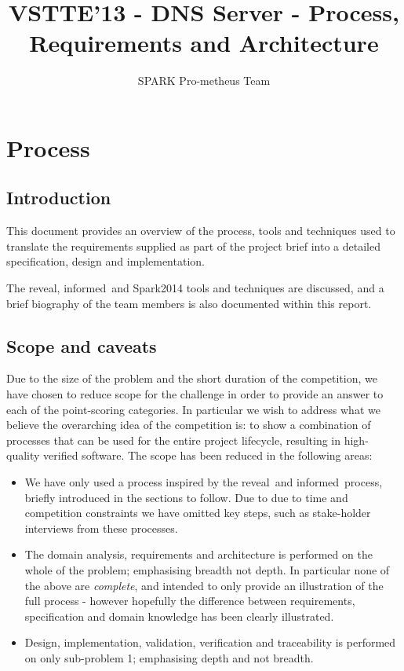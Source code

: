 \documentclass{report}
\title{VSTTE'13 - DNS Server - Process, Requirements and Architecture}
\author{SPARK Pro-metheus Team}
\newcommand{\spark}[0]{{\sc Spark}}
\newcommand{\reveal}[0]{{\sc reveal}\texttrademark}
\newcommand{\informed}[0]{{\sc informed}}
\begin{document}
\maketitle
\tableofcontents

\chapter{Process}
\section{Introduction}
This document provides an overview of the process, tools and
techniques used to translate the requirements supplied as
part of the project brief into a detailed specification, design
and implementation.

The \reveal, \informed\ and \spark 2014 tools and techniques are
discussed, and a brief biography of the team members is also
documented within this report.

\section{Scope and caveats}
Due to the size of the problem and the short duration of the
competition, we have chosen to reduce scope for the challenge in order
to provide an answer to each of the point-scoring categories. In
particular we wish to address what we believe the overarching idea of
the competition is: to show a combination of processes that can be
used for the entire project lifecycle, resulting in high-quality
verified software. The scope has been reduced in the following areas:

\begin{itemize}
\item We have only used a process inspired by the \reveal\ and
  \informed\ process, briefly introduced in the sections to
  follow. Due to due to time and competition constraints we have
  omitted key steps, such as stake-holder interviews from these
  processes.

\item The domain analysis, requirements and architecture is performed
  on the whole of the problem; emphasising breadth not depth. In
  particular none of the above are \emph{complete}, and intended to
  only provide an illustration of the full process - however hopefully
  the difference between requirements, specification and domain
  knowledge has been clearly illustrated.

\item Design, implementation, validation, verification and
  traceability is performed on only sub-problem 1; emphasising depth
  and not breadth.
\end{itemize}
\end{document}
